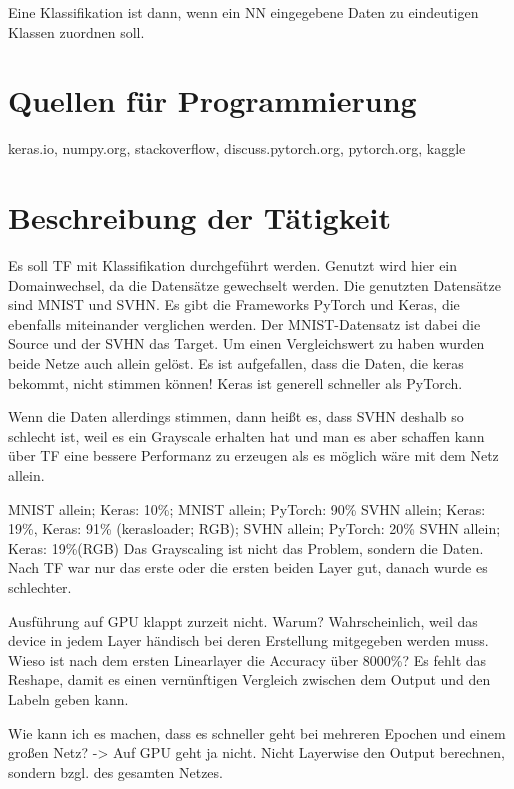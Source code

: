 Eine Klassifikation ist dann, wenn ein NN eingegebene Daten zu 
    eindeutigen Klassen zuordnen soll.

\section{Quellen für Programmierung}
keras.io, numpy.org, stackoverflow, discuss.pytorch.org, pytorch.org, kaggle

\section{Beschreibung der Tätigkeit}
    
    Es soll TF mit Klassifikation durchgeführt werden. 
    Genutzt wird hier ein Domainwechsel, da die Datensätze gewechselt werden. 
    Die genutzten Datensätze sind MNIST und SVHN. 
    Es gibt die Frameworks PyTorch und Keras, die ebenfalls miteinander 
    verglichen werden. 
    Der MNIST-Datensatz ist dabei die Source und der SVHN das Target. 
    Um einen Vergleichswert zu haben wurden beide Netze auch allein gelöst. 
    Es ist aufgefallen, dass die Daten, die keras bekommt, nicht stimmen können!
    Keras ist generell schneller als PyTorch. 

    Wenn die Daten allerdings stimmen, dann heißt es, dass SVHN deshalb so schlecht 
    ist, weil es ein Grayscale erhalten hat und man es aber schaffen kann über TF 
    eine bessere Performanz zu erzeugen als es möglich wäre mit dem Netz allein.

    MNIST allein; Keras: 10\%; MNIST allein; PyTorch: 90\% 
    SVHN allein; Keras: 19\%, Keras: 91\% (kerasloader; RGB); SVHN allein; PyTorch: 20\%
    SVHN allein; Keras: 19\%(RGB)
    Das Grayscaling ist nicht das Problem, sondern die Daten. 
    Nach TF war nur das erste oder die ersten beiden Layer gut, danach wurde es 
    schlechter.

    Ausführung auf GPU klappt zurzeit nicht. Warum? Wahrscheinlich, 
    weil das device in jedem Layer händisch bei deren Erstellung mitgegeben 
    werden muss.
    Wieso ist nach dem ersten Linearlayer die Accuracy über 8000\%?
    Es fehlt das Reshape, damit es einen vernünftigen Vergleich 
    zwischen dem Output und den Labeln geben kann.
    
    Wie kann ich es machen, dass es schneller geht bei mehreren Epochen 
    und einem großen Netz? -> Auf GPU geht ja nicht.
    Nicht Layerwise den Output berechnen, sondern bzgl. des gesamten Netzes.

